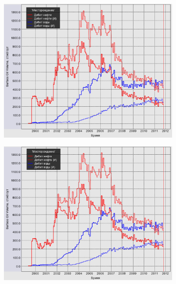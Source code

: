 \documentclass[a4paper,12pt]{article}
\begin{document}
\begin{figure}[H]
	\begin{subfigure}[t]{\dimexpr.5\linewidth-1.3em\relax}
		\centering
		\includegraphics[width=.9\linewidth]{rates_default_model}
	\end{subfigure}
\hfill %
	\begin{subfigure}[t]{\dimexpr.5\linewidth-1.3em\relax}
		\centering
		\includegraphics[width=.9\linewidth]{rates_anizotropy_model}
	\end{subfigure}
\\[20pt]
\begin{subfigure}[t]{\dimexpr.5\linewidth-1.3em\relax}

\end{subfigure}
\end{figure}
\end{document}
